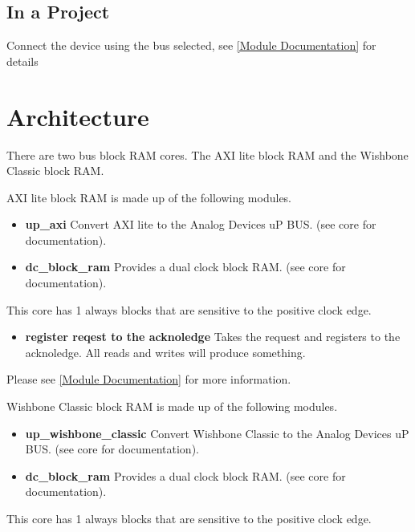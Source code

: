 



\subsection{In a Project}
\par
Connect the device using the bus selected, see \ref{Module Documentation} for details

\section{Architecture}
\par
There are two bus block RAM cores. The AXI lite block RAM and the Wishbone Classic block RAM.

AXI lite block RAM is made up of the following modules.
\begin{itemize}
  \item \textbf{up\_axi} Convert AXI lite to the Analog Devices uP BUS. (see core for documentation).
  \item \textbf{dc\_block\_ram} Provides a dual clock block RAM. (see core for documentation).
\end{itemize}

\par
This core has 1 always blocks that are sensitive to the positive clock edge.

\begin{itemize}
\item \textbf{register reqest to the acknoledge} Takes the request and registers to the acknoledge. All reads and writes will produce something.
\end{itemize}

Please see \ref{Module Documentation} for more information.

Wishbone Classic block RAM is made up of the following modules.
\begin{itemize}
  \item \textbf{up\_wishbone\_classic} Convert Wishbone Classic to the Analog Devices uP BUS. (see core for documentation).
  \item \textbf{dc\_block\_ram} Provides a dual clock block RAM. (see core for documentation).
\end{itemize}

\par
This core has 1 always blocks that are sensitive to the positive clock edge.

